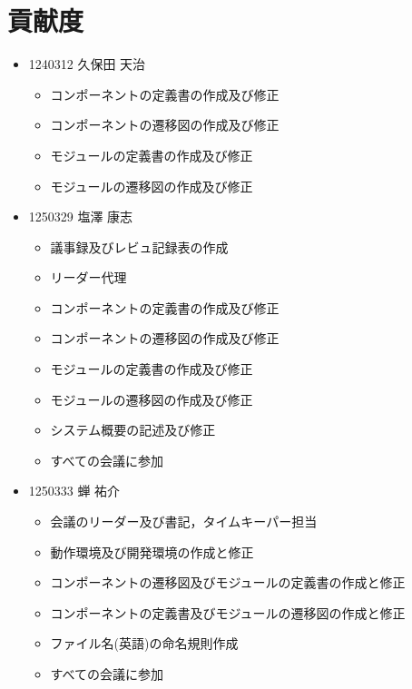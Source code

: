 \documentclass[a4paper, titlepage]{jsarticle}
\begin{document}
\clearpage
\section{貢献度}
\begin{itemize}
\item 1240312 久保田 天治
  \begin{itemize}
  \item コンポーネントの定義書の作成及び修正
  \item コンポーネントの遷移図の作成及び修正
  \item モジュールの定義書の作成及び修正
  \item モジュールの遷移図の作成及び修正
  \end{itemize}

\item 1250329 塩澤 康志
  \begin{itemize}
  \item 議事録及びレビュ記録表の作成
  \item リーダー代理
  \item コンポーネントの定義書の作成及び修正
  \item コンポーネントの遷移図の作成及び修正
  \item モジュールの定義書の作成及び修正
  \item モジュールの遷移図の作成及び修正
  \item システム概要の記述及び修正
  \item すべての会議に参加
  \end{itemize}

\item 1250333 蝉 祐介
  \begin{itemize}
  \item 会議のリーダー及び書記，タイムキーパー担当
  \item 動作環境及び開発環境の作成と修正
  \item コンポーネントの遷移図及びモジュールの定義書の作成と修正
  \item コンポーネントの定義書及びモジュールの遷移図の作成と修正
  \item ファイル名(英語)の命名規則作成
  \item すべての会議に参加
  \end{itemize}


\end{itemize}
\end{document}

